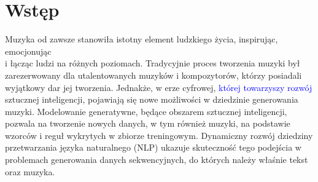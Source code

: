 \documentclass[data-science]{agh-wi} %
\begin{document}
\tableofcontents   %
\newpage
\listoffigures     %
\listoftables      %
\mainmatter %
\chapter{Wstęp}
Muzyka od zawsze stanowiła istotny element ludzkiego życia, inspirując, emocjonując \\i łącząc ludzi na różnych poziomach. Tradycyjnie proces tworzenia muzyki był zarezerwowany dla utalentowanych muzyków i kompozytorów, którzy posiadali wyjątkowy dar jej tworzenia. Jednakże, w erze cyfrowej, \textcolor{blue}{której towarzyszy rozwój} sztucznej inteligencji, pojawiają się nowe możliwości w dziedzinie generowania muzyki. Modelowanie generatywne, będące obszarem sztucznej inteligencji, pozwala na tworzenie nowych danych, w tym również muzyki, na podstawie wzorców i reguł wykrytych w zbiorze treningowym. Dynamiczny rozwój dziedziny przetwarzania języka naturalnego (NLP) ukazuje skuteczność tego podejścia w problemach generowania danych sekwencyjnych, do których należy właśnie tekst oraz muzyka.
\end{document}

